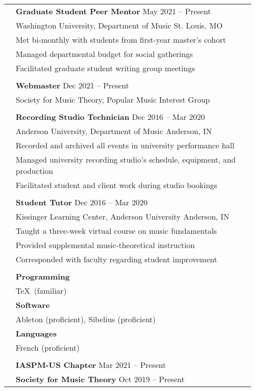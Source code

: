 \documentclass[letterpaper, 11pt]{article}
\begin{document}
\begin{longtable}{p{1.3in}p{4.8in}}
& \textbf{Graduate Student Peer Mentor} \hfill May 2021  -- Present \\
& Washington University, Department of Music \hfill St. Louis, MO\\
& Met bi-monthly with students from first-year master's cohort \\
& Managed departmental budget for social gatherings \\
& Facilitated graduate student writing group meetings \\
& \\

{\color{OliveGreen}{Professional Service}}
& \textbf{Webmaster} \hfill Dec 2021  -- Present \\
& Society for Music Theory, Popular Music Interest Group\\
& \\

& \textbf{Recording Studio Technician} \hfill Dec 2016 -- Mar 2020 \\
&  Anderson University, Department of Music \hfill Anderson, IN \\
& Recorded and archived all events in university performance hall \\
& Managed university recording studio's schedule, equipment, and production \\
& Facilitated student and client work during studio bookings \\
& \\

& \textbf{Student Tutor} \hfill Dec 2016 -- Mar 2020 \\
& Kissinger Learning Center, Anderson University \hfill Anderson, IN \\
& Taught a three-week virtual course on music fundamentals \\
& Provided supplemental music-theoretical instruction \\
& Corresponded with faculty regarding student improvement \\
& \\

{\color{OliveGreen}{Proficiencies}} 
& \textbf{Programming} \\
& \TeX~(familiar) \\
& \textbf{Software} \\
& Ableton (proficient), Sibelius (proficient) \\
& \textbf{Languages} \\
& French (proficient) \\
& \\


{\color{OliveGreen}{Memberships}} 
& \textbf{IASPM-US Chapter} \hfill Mar 2021 -- Present \\
& \textbf{Society for Music Theory} \hfill Oct 2019 -- Present \\
\end{longtable}
\end{document}

